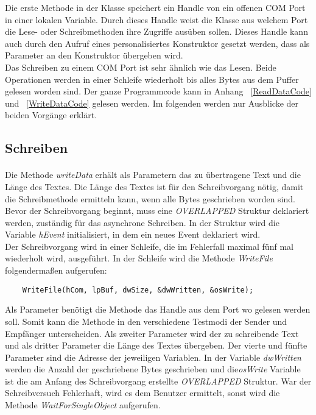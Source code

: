 Die erste Methode in der Klasse speichert ein Handle von ein offenen COM Port in einer lokalen Variable. Durch dieses Handle weist die Klasse aus welchem Port die Lese- oder Schreibmethoden ihre Zugriffe ausüben sollen. Dieses Handle kann auch durch den Aufruf eines personalisiertes Konstruktor gesetzt werden, dass als Parameter an den Konstruktor übergeben wird.\\

Das Schreiben zu einem COM Port ist sehr ähnlich wie das Lesen. Beide Operationen werden in einer Schleife wiederholt bis alles Bytes aus dem Puffer gelesen worden sind. Der ganze Programmcode kann in Anhang ~\ref{ReadDataCode} und ~\ref{WriteDataCode} gelesen werden. Im folgenden werden nur Ausblicke der beiden Vorgänge erklärt.\\

\subsection{Schreiben}
\paragraph{}
Die Methode \textit{writeData} erhält als Parametern das zu übertragene Text und die Länge des Textes. Die Länge des Textes ist für den Schreibvorgang nötig, damit die Schreibmethode ermitteln kann, wenn alle Bytes geschrieben worden sind. Bevor der Schreibvorgang beginnt, muss eine \textit{OVERLAPPED} Struktur deklariert werden, zuständig für das asynchrone Schreiben. In der Struktur wird die Variable \textit{hEvent} initialisiert, in dem ein neues Event deklariert wird.\\

Der Schreibvorgang wird in einer Schleife, die im Fehlerfall maximal fünf mal wiederholt wird, ausgeführt. In der Schleife wird die Methode \textit{WriteFile} folgendermaßen aufgerufen:
\begin{lstlisting}
	WriteFile(hCom, lpBuf, dwSize, &dwWritten, &osWrite);
\end{lstlisting}

Als Parameter benötigt die Methode das Handle aus dem Port wo gelesen werden soll. Somit kann die Methode in den verschiedene Testmodi der Sender und Empfänger unterscheiden. Als zweiter Parameter wird der zu schreibende Text und als dritter Parameter die Länge des Textes übergeben. Der vierte und fünfte Parameter sind die Adresse der jeweiligen Variablen. In der Variable \textit{dwWritten} werden die Anzahl der geschriebene Bytes geschrieben und die\textit{osWrite} Variable ist die am Anfang des Schreibvorgang erstellte \textit{OVERLAPPED} Struktur. War der Schreibversuch Fehlerhaft, wird es dem Benutzer ermittelt, sonst wird die Methode \textit{WaitForSingleObject} aufgerufen.

